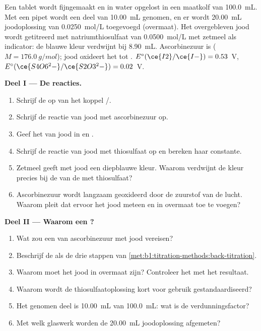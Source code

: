 \begin{problem}
\label{pb:b1:titration-methods:1}
Een tablet wordt fijngemaakt en in water opgelost in een maatkolf van
\qty{100.0}{mL}. Met een pipet wordt een deel van \qty{10.00}{mL}
genomen, en er wordt \qty{20.00}{mL} joodoplossing van
\qty{0.0250}{mol/L} toegevoegd (overmaat). Het overgebleven jood wordt
getitreerd met natriumthiosulfaat van \qty{0.0500}{mol/L} met zetmeel als
indicator: de blauwe kleur verdwijnt bij \qty{8.90}{mL}. Ascorbinezuur is
 ($M = \qty{176.0}{g/mol}$); jood oxideert het tot
. $E^\circ(\ce{I2}/\ce{I-}) = 0.53$~V,
$E^\circ(\ce{S4O6^2-}/\ce{S2O3^2-}) = 0.02$~V.

\medskip
\noindent\textbf{Deel I --- De reacties.}
\begin{enumerate}
  \item Schrijf de  op van het koppel /.
  \item Schrijf de reactie van jood met ascorbinezuur op.
  \item Geef het  van jood in  en .
  \item Schrijf de reactie van jood met thiosulfaat op en bereken haar
        constante.
  \item Zetmeel geeft met jood een diepblauwe kleur. Waarom verdwijnt de
        kleur precies bij de  van de  met
        thiosulfaat?
  \item Ascorbinezuur wordt langzaam geoxideerd door de zuurstof van de
        lucht. Waarom pleit dat ervoor het jood meteen en in overmaat toe
        te voegen?
\end{enumerate}

\medskip
\noindent\textbf{Deel II --- Waarom een ?}
\begin{enumerate}[resume]
  \item Wat zou een  van ascorbinezuur met jood vereisen?
  \item Beschrijf de  als de drie stappen van
        \cref{met:b1:titration-methods:back-titration}.
  \item Waarom moet het jood in overmaat zijn? Controleer het met het
        resultaat.
  \item Waarom wordt de thiosulfaatoplossing kort voor gebruik
        gestandaardiseerd?
  \item Het genomen deel is \qty{10.00}{mL} van \qty{100.0}{mL}: wat is de
        verdunningsfactor?
  \item Met welk glaswerk worden de \qty{20.00}{mL} joodoplossing
        afgemeten?
\end{enumerate}


\end{problem}
